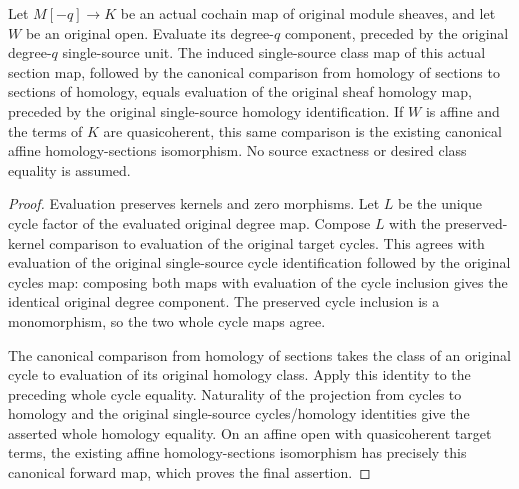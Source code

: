 \begin{lemma}
\label{lem:di-single-source-canonical-evaluation}
\leanok
Let $M[-q]\to K$ be an actual cochain map of original module sheaves,
and let $W$ be an original open. Evaluate its degree-$q$ component,
preceded by the original degree-$q$ single-source unit. The induced
single-source class map of this actual section map, followed by the
canonical comparison from homology of sections to sections of
homology, equals evaluation of the original sheaf homology map,
preceded by the original single-source homology identification.
If $W$ is affine and the terms of $K$ are quasicoherent, this same
comparison is the existing canonical affine homology-sections
isomorphism. No source exactness or desired class equality is assumed.
\end{lemma}
\begin{proof}
Evaluation preserves kernels and zero morphisms. Let $L$ be the unique
cycle factor of the evaluated original degree map. Compose $L$ with
the preserved-kernel comparison to evaluation of the original target
cycles. This agrees with evaluation of the original single-source
cycle identification followed by the original cycles map: composing
both maps with evaluation of the cycle inclusion gives the identical
original degree component. The preserved cycle inclusion is a
monomorphism, so the two whole cycle maps agree.

The canonical comparison from homology of sections takes the class of
an original cycle to evaluation of its original homology class. Apply
this identity to the preceding whole cycle equality. Naturality of the
projection from cycles to homology and the original single-source
cycles/homology identities give the asserted whole homology equality.
On an affine open with quasicoherent target terms, the existing affine
homology-sections isomorphism has precisely this canonical forward map,
which proves the final assertion.
\end{proof}

